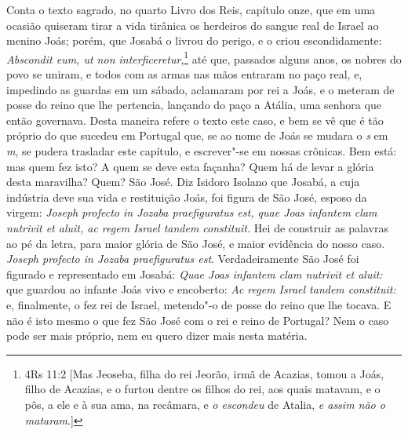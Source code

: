 Conta o texto sagrado, no quarto Livro dos Reis, capítulo onze, que em
uma ocasião quiseram tirar a vida tirânica os herdeiros do sangue real
de Israel ao menino Joás; porém, que Josabá o livrou do perigo, e o
criou escondidamente:
\emph{Abscondit eum, ut non interficeretur},\footnote{4Rs 11:2 [Mas Jeoseba, filha do rei Jeorão, irmã de Acazias, tomou a Joás, filho de Acazias, e o furtou dentre os filhos do rei, aos quais matavam, e o pôs, a ele e à sua ama, na recâmara, e \textit{o escondeu} de Atalia, \textit{e assim não o mataram}.]} até que, passados
alguns anos, os nobres do povo se uniram, e todos com as armas nas mãos
entraram no paço real, e, impedindo as guardas em um sábado, aclamaram
por rei a Joás, e o meteram de posse do reino que lhe pertencia,
lançando do paço a Atália, uma senhora que então governava. Desta
maneira refere o texto este caso, e bem se vê que é tão próprio do que
sucedeu em Portugal que, se ao nome de Joás se mudara o \emph{s} em \emph{m},
se pudera trasladar este capítulo, e escrever"-se em nossas crônicas. Bem
está: mas quem fez isto? A quem se deve esta façanha? Quem há de levar a
glória desta maravilha? Quem? São José. Diz Isidoro Isolano que Josabá,
a cuja indústria deve sua vida e restituição Joás, foi figura de São
José, esposo da virgem: \emph{Joseph profecto in Jozaba praefiguratus
est, quae Joas infantem clam nutrivit et aluit, ac regem Israel tandem
constituit.} Hei de construir as palavras ao pé da letra, para maior
glória de São José, e maior evidência do nosso caso. \emph{Joseph
profecto in Jozaba praefiguratus est}. Verdadeiramente São José foi
figurado e representado em Josabá: \emph{Quae Joas infantem clam
nutrivit et aluit:} que guardou ao infante Joás vivo e encoberto:
\emph{Ac regem Israel tandem constituit:} e, finalmente, o fez rei de
Israel, metendo"-o de posse do reino que lhe tocava. E não é isto mesmo
o que fez São José com o rei e reino de Portugal? Nem o caso pode ser
mais próprio, nem eu quero dizer mais nesta matéria.

